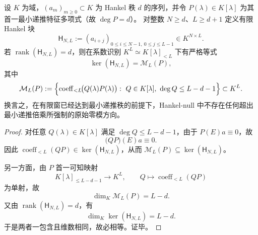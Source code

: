\begin{theorem}\label{thm:pom-hankel-finite-window-principal-rigidity}
设 \(K\) 为域，\((a_m)_{m\ge 0}\subset K\) 为 Hankel 秩 \(d\) 的序列，并令 \(P(\lambda)\in K[\lambda]\) 为其首一最小递推特征多项式（故 \(\deg P=d\)）。
对整数 \(N\ge d\)、\(L\ge d+1\) 定义有限 Hankel 块
\[
\mathsf H_{N,L}:=(a_{i+j})_{0\le i\le N-1,\ 0\le j\le L-1}\in K^{N\times L}.
\]
若 \(\operatorname{rank}(\mathsf H_{N,L})=d\)，则在系数识别
\(
K^L\simeq K[\lambda]_{<L}
\)
下有严格等式
\[
\ker(\mathsf H_{N,L})
=
\mathcal M_L(P),
\]
其中
\[
\mathcal M_L(P):=
\Bigl\{
\operatorname{coeff}_{<L}\!\bigl(Q(\lambda)P(\lambda)\bigr):
\ Q\in K[\lambda],\ \deg Q\le L-d-1
\Bigr\}\subset K^L.
\]
换言之，在有限窗已经达到最小递推秩的前提下，Hankel-null 中不存在任何超出最小递推倍乘所强制的原始零模方向。
\end{theorem}
\begin{proof}
对任意 \(Q(\lambda)\in K[\lambda]\) 满足 \(\deg Q\le L-d-1\)，由于 \(P(E)a\equiv 0\)，故
\[
\bigl(QP\bigr)(E)a\equiv 0.
\]
因此 \(\operatorname{coeff}_{<L}(QP)\in\ker(\mathsf H_{N,L})\)，从而
\(
\mathcal M_L(P)\subseteq \ker(\mathsf H_{N,L})
\)。

另一方面，由 \(P\) 首一可知映射
\[
K[\lambda]_{\le L-d-1}\longrightarrow K^L,
\qquad
Q\longmapsto \operatorname{coeff}_{<L}(QP)
\]
为单射，故
\[
\dim_K\mathcal M_L(P)=L-d.
\]
又由 \(\operatorname{rank}(\mathsf H_{N,L})=d\)，有
\[
\dim_K\ker(\mathsf H_{N,L})=L-d.
\]
于是两者一包含且维数相同，故必相等。证毕。
\end{proof}


